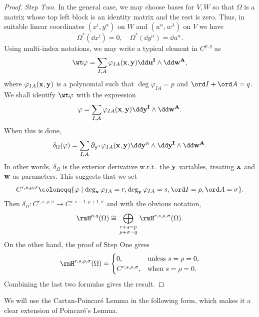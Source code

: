 \begin{proof}
    \emph{Step Two.} In the general case, we may choose bases for $V,W$ so that $\Omega$ is a matrix whose top left block is an identity matrix and the rest is zero. Thus, in suitable linear coordinates $(x^i,y^\alpha)$ on $W$ and $(u^\alpha,w^\lambda)$ on $V$ we have 
    \[\Omega^\ast(\dd x^i)=0,\quad \Omega^\ast(\dd y^\alpha)=\dd u^\alpha.\]
    Using multi-index notations, we may write a typical element in $C^{p,q}$ as 
    \[\wt\varphi=\sum_{I,A}\varphi_{IA}(\bf{x},\bf{y})\dd \bf{u}^I\wedge\dd \bf{w}^A,\]
    where $\varphi_{IA}(\bf{x},\bf{y})$ is a polynomial such that $\deg\varphi_{IA}=p$ and $\ord I+\ord A=q$. We shall identify $\wt\varphi$ with the expression 
    \[\varphi=\sum_{I,A}\varphi_{IA}(\bf{x},\bf{y})\dd \bf{y}^I\wedge\dd \bf{w}^A.\]
    When this is done, 
    \[\delta_\Omega(\varphi)=\sum_{I,A}\partial_{y^\alpha}\varphi_{IA}(\bf{x},\bf{y})\dd y^\alpha\wedge\dd \bf{y}^I\wedge\dd \bf{w}^A.\]
    In other words, $\delta_\Omega$ is the exterior derivative w.r.t.\ the $\bf{y}$ variables, treating $\bf{x}$ and $\bf{w}$ as parameters. This suggests that we set 
    \[C^{r,s,\rho,\sigma}\coloneqq \{\varphi\mid \deg_{\bf{x}}\varphi_{IA}=r,\deg_{\bf{y}}\varphi_{IA}=s,\ord I=\rho,\ord A=\sigma\}.\]
    Then $\delta_\Omega:C^{r,s,\rho,\sigma}\to C^{r,s-1,\rho+1,\sigma}$ and with the obvious notation, 
    \[\rmH^{p,q}(\Omega)\cong \bigoplus_{
        \begin{smallmatrix}
            r+s=p\\
            \rho+\sigma=q
        \end{smallmatrix}}\rmH^{r,s,\rho,\sigma}(\Omega).\]
        On the other hand, the proof of Step One gives 
        \[\rmH^{r,s,\rho,\sigma}(\Omega)=\begin{cases}
            0, & \text{unless }s=\rho=0,\\
            C^{r,s,\rho,\sigma}, & \text{when }s=\rho=0.
        \end{cases}\]
        Combining the last two formulas gives the result.
\end{proof}

We will use the Cartan-Poincar\'e Lemma in the following form, which makes it a clear extension of Poincar\'e's Lemma.

